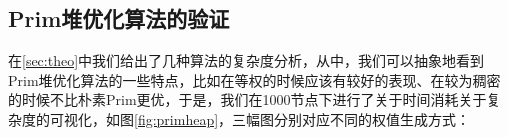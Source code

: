 \documentclass[UTF8]{ctexart}
\begin{document}
\subsection{Prim堆优化算法的验证}
在\ref{sec:theo}中我们给出了几种算法的复杂度分析，从中，我们可以抽象地看到Prim堆优化算法的一些特点，比如在等权的时候应该有较好的表现、在较为稠密的时候不比朴素Prim更优，于是，我们在1000节点下进行了关于时间消耗关于复杂度的可视化，如图\ref{fig:primheap}，三幅图分别对应不同的权值生成方式：
\begin{figure}[htbp]
    \centering
    

\end{figure}
\end{document}
